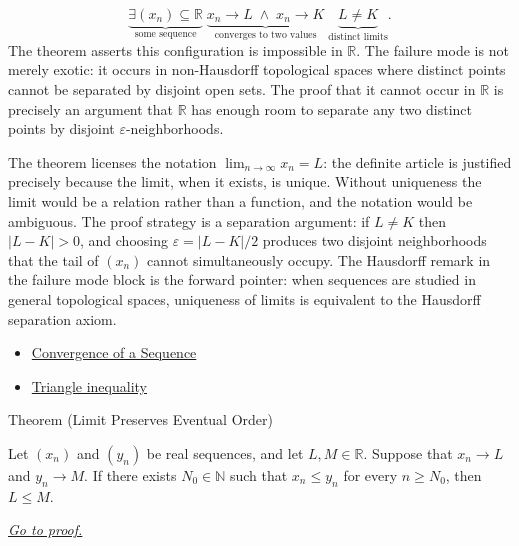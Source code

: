 \begin{remark*}
\[
\underbrace{\exists (x_n) \subseteq \mathbb{R}}_{\text{some sequence}}
\;\underbrace{x_n \to L \;\land\; x_n \to K}_{\text{converges to two values}}
\;\underbrace{L \neq K}_{\text{distinct limits}}.
\]
The theorem asserts this configuration is impossible in $\mathbb{R}$.
The failure mode is not merely exotic: it occurs in non-Hausdorff
topological spaces where distinct points cannot be separated by disjoint
open sets. The proof that it cannot occur in $\mathbb{R}$ is precisely
an argument that $\mathbb{R}$ has enough room to separate any two
distinct points by disjoint $\varepsilon$-neighborhoods.
\end{remark*}

\begin{remark*}[Interpretation]
The theorem licenses the notation $\displaystyle\lim_{n \to \infty} x_n
= L$: the definite article is justified precisely because the limit,
when it exists, is unique. Without uniqueness the limit would be a
relation rather than a function, and the notation would be ambiguous.
The proof strategy is a separation argument: if $L \neq K$ then
$|L - K| > 0$, and choosing $\varepsilon = |L - K|/2$ produces two
disjoint neighborhoods that the tail of $(x_n)$ cannot simultaneously
occupy. The Hausdorff remark in the failure mode block is the forward
pointer: when sequences are studied in general topological spaces,
uniqueness of limits is equivalent to the Hausdorff separation axiom.
\end{remark*}

\begin{remark*}[Dependencies]
\begin{itemize}
  \item \hyperref[def:convergent-sequence]{Convergence of a Sequence}
  \item \hyperref[thm:triangle-inequality]{Triangle inequality}
\end{itemize}
\end{remark*}


\begin{theorembox}{Theorem (Limit Preserves Eventual Order)}
\begin{theorem}
\label{thm:limit-preserves-eventual-order}

Let $(x_n)$ and $(y_n)$ be real sequences, and let $L,M\in\mathbb{R}$.
Suppose that $x_n\to L$ and $y_n\to M$. If there exists
$N_0\in\mathbb{N}$ such that $x_n\le y_n$ for every $n\ge N_0$, then
$L\le M$.

\smallskip
\noindent
\hyperref[prf:limit-preserves-eventual-order]{\textit{Go to proof.}}
\end{theorem}
\end{theorembox}

